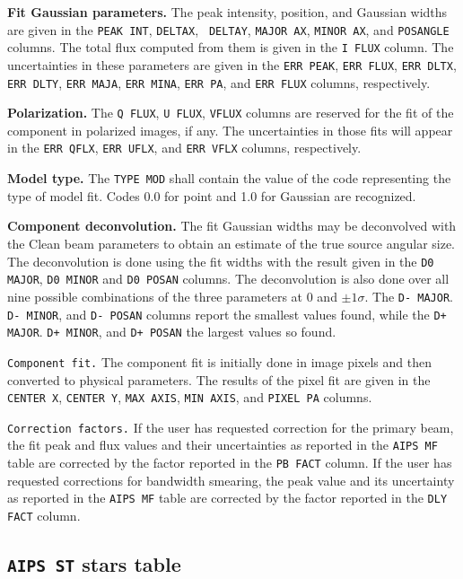 \documentclass[twoside]{article}
\begin{document}
{\bf Fit Gaussian parameters.} The peak intensity, position, and
Gaussian widths are given in the {\tt PEAK INT}, {\tt DELTAX}, {\tt
  DELTAY}, {\tt MAJOR AX}, {\tt MINOR AX}, and {\tt POSANGLE} columns.
The total flux computed from them is given in the {\tt I FLUX}
column.  The uncertainties in these parameters are given in the
{\tt ERR PEAK}, {\tt ERR FLUX}, {\tt ERR DLTX}, {\tt ERR DLTY},
{\tt ERR MAJA}, {\tt ERR MINA}, {\tt ERR PA}, and {\tt ERR FLUX}
columns, respectively.

{\bf Polarization.} The {\tt Q FLUX}, {\tt U FLUX}, {\tt VFLUX}
columns are reserved for the fit of the component in polarized images,
if any.  The uncertainties in those fits will appear in the {\tt ERR
  QFLX}, {\tt ERR UFLX}, and {\tt ERR VFLX} columns, respectively.

{\bf Model type.} The {\tt TYPE MOD} shall contain the value of the
code representing the type of model fit.  Codes 0.0 for point and 1.0
for Gaussian are recognized.

{\bf Component deconvolution.} The fit Gaussian widths may be
deconvolved with the Clean beam parameters to obtain an estimate of
the true source angular size.  The deconvolution is done using the fit
widths with the result given in the {\tt D0 MAJOR}, {\tt D0 MINOR} and
{\tt D0 POSAN} columns.  The deconvolution is also done over all nine
possible combinations of the three parameters at 0 and $\pm 1
\sigma$.  The {\tt D- MAJOR}. {\tt D- MINOR}, and {\tt D- POSAN}
columns report the smallest values found, while the {\tt D+ MAJOR}.
{\tt D+ MINOR}, and {\tt D+ POSAN} the largest values so found.

{\tt Component fit.} The component fit is initially done in image
pixels and then converted to physical parameters.  The results of the
pixel fit are given in the {\tt CENTER X}, {\tt CENTER Y}, {\tt MAX
  AXIS}, {\tt MIN AXIS}, and {\tt PIXEL PA} columns.

{\tt Correction factors.} If the user has requested correction for the
primary beam, the fit peak and flux values and their uncertainties as
reported in the {\tt AIPS MF} table are corrected by the factor
reported in the {\tt PB FACT} column.  If the user has requested
corrections for bandwidth smearing, the peak value and its uncertainty
as reported in the {\tt AIPS MF} table are corrected by the factor
reported in the {\tt DLY FACT} column.

\subsection{{\tt AIPS ST} stars table}
\label{s:ST}
\end{document}
